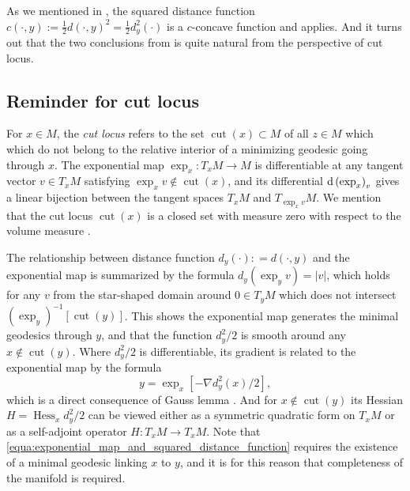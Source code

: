 As we mentioned in ,
the squared distance function $c(\cdot, y):=\frac{1}{2}d(\cdot,y)^2=\frac{1}{2}d^2_y(\cdot)$
is a $c$-concave function and  applies.
And it turns out that the two conclusions from
 is quite natural from the perspective of cut locus.

\subsection{Reminder for cut locus}

For \( x \in M \), the \emph{cut locus} refers to the set \( \operatorname{cut}( x ) \subset M \) of all \( z \in M \) which
which do not belong to the relative interior of a minimizing geodesic going
through $x$.
The exponential map \( \exp _ { x } : T _ { x } M \rightarrow M \) is differentiable
at any tangent vector \( v \in T _ { x } M \) satisfying \( \exp _ { x } v \notin \operatorname{cut}( x )\),
and its differential \( \operatorname{d} \left( \exp _ { x } \right) _ { v } \) gives a linear bijection between the tangent
spaces \( T _ { x } M \) and \( T _ { \exp _ { x } v} M\).
We mention that the cut locus $\operatorname{cut} (x)$ is a closed set with measure zero
with respect to the volume measure \cite[Lemma 3.96]{gallot2004riemannian}.

The relationship between distance function $d_y(\cdot) : = d(\cdot, y) $ and the
exponential map is summarized by the formula \( d _ { y } \left( \exp _ { y } v \right) = | v | \),
which holds for any \( v \) from the star-shaped domain around \( 0 \in T _ { y } M \)
which does not intersect \( \left( \exp _ { y } \right) ^ { - 1 } [ \operatorname{cut} ( y ) ]\).
This shows the exponential map generates the minimal geodesics through \( y \),
and that the function \( d _ { y } ^ { 2 } / 2 \) is smooth around any \( x \notin \operatorname{cut} ( y ) \).
Where \( d _ { y } ^ { 2 } / 2 \) is differentiable,
its gradient is related to the exponential map by the formula
\begin{equation}
	\label{equa:exponential_map_and_squared_distance_function}
	y = \exp _ { x } \left[ - \nabla d _ { y } ^ { 2 } ( x ) / 2 \right],
\end{equation}
which is a direct consequence of Gauss lemma \cite[Lemma 5.5.5]{petersen2016riemannian}.
And for \( x \notin \operatorname { cut } ( y ) \) its Hessian \( H = \operatorname{ Hess} _ { x } d _ { y } ^ { 2 } / 2 \) can be viewed either as a symmetric quadratic form on \( T _ { x } M \) or as a self-adjoint operator
\( H : T _ { x } M \rightarrow T _ { x } M \).
Note that \cref{equa:exponential_map_and_squared_distance_function} requires the existence of
a minimal geodesic linking \( x \) to \( y \),
and it is for this reason that completeness of the manifold is required.

